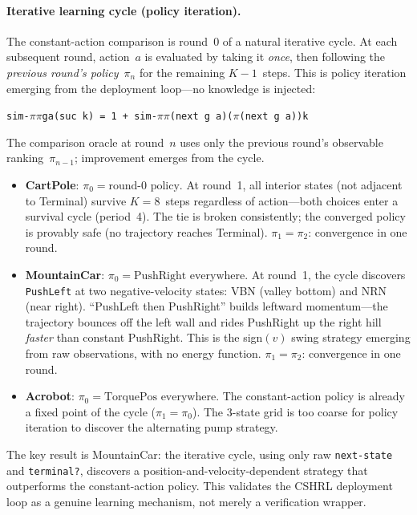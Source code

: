 \documentclass[9pt,a4paper]{article}
\theoremstyle{plain}
\theoremstyle{definition}
\theoremstyle{remark}
\begin{document}
\paragraph{Iterative learning cycle (policy iteration).}
The constant-action comparison is round~0 of a natural iterative cycle.  At each subsequent round, action~$a$ is evaluated by taking it \emph{once}, then following the \emph{previous round's policy}~$\pi_n$ for the remaining $K{-}1$~steps.  This is policy iteration emerging from the deployment loop---no knowledge is injected:

\smallskip
\noindent\texttt{sim-$\pi$\;$\pi$\;g\;a\;(suc k) = 1 + sim-$\pi$\;$\pi$\;(next g a)\;($\pi$\;(next g a))\;k}

\smallskip
\noindent The comparison oracle at round~$n$ uses only the previous round's observable ranking~$\pi_{n-1}$; improvement emerges from the cycle.

\begin{itemize}
\item \textbf{CartPole}: $\pi_0 = \text{round-0 policy}$.  At round~1, all interior states (not adjacent to Terminal) survive $K{=}8$~steps regardless of action---both choices enter a survival cycle (period~4).  The tie is broken consistently; the converged policy is provably safe (no trajectory reaches Terminal).  $\pi_1 = \pi_2$: convergence in one round.
\item \textbf{MountainCar}: $\pi_0 = \text{PushRight everywhere}$.  At round~1, the cycle discovers \texttt{PushLeft} at two negative-velocity states: VBN (valley bottom) and NRN (near right).  ``PushLeft then PushRight'' builds leftward momentum---the trajectory bounces off the left wall and rides PushRight up the right hill \emph{faster} than constant PushRight.  This is the sign$(v)$ swing strategy emerging from raw observations, with no energy function.  $\pi_1 = \pi_2$: convergence in one round.
\item \textbf{Acrobot}: $\pi_0 = \text{TorquePos everywhere}$.  The constant-action policy is already a fixed point of the cycle ($\pi_1 = \pi_0$).  The 3-state grid is too coarse for policy iteration to discover the alternating pump strategy.
\end{itemize}

The key result is MountainCar: the iterative cycle, using only raw \texttt{next-state} and \texttt{terminal?}, discovers a position-and-velocity-dependent strategy that outperforms the constant-action policy.  This validates the CSHRL deployment loop as a genuine learning mechanism, not merely a verification wrapper.
\end{document}
